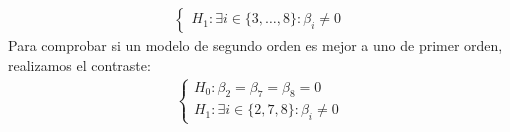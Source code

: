 \begin{ejemplo}
\begin{align*}
\begin{cases}
            H_1 : \exists i \in \{3,\ldots,8\} : \beta_i \not = 0
        \end{cases}
    \end{align*}
    Para comprobar si un modelo de segundo orden es mejor a uno de primer orden, realizamos el contraste:
    \begin{align*}
        \begin{cases}
            H_0: \beta_2 = \beta_7 = \beta_8 = 0 \\
            H_1: \exists i \in \{2,7,8\} : \beta_i \not = 0
        \end{cases}
    \end{align*}
\end{ejemplo}